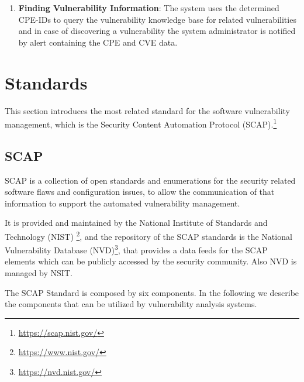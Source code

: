 \documentclass{llncs}
\begin{document}
\begin{enumerate}
   \item \textbf{Finding Vulnerability Information}: The system uses the determined CPE-IDs to query the vulnerability knowledge base for related vulnerabilities and in case of discovering a vulnerability  the system administrator is notified by alert containing the CPE and CVE data.      
   
 
 \end{enumerate}



\section{Standards}
This section introduces the most related standard for the software vulnerability management, which is the Security Content Automation Protocol (SCAP).\footnote{\url{https://scap.nist.gov/}}


\subsection{SCAP}

\par SCAP is a collection of open standards and enumerations for the security related software flaws and configuration issues, to allow the communication of that information to support the automated vulnerability management\cite{scap_doc}. \par   
 It is provided and maintained by the National Institute of Standards and Technology (NIST) \footnote{\url{https://www.nist.gov/}}, and the repository of the SCAP standards is the National Vulnerability Database (NVD)\footnote{\url{https://nvd.nist.gov/}}, that provides a data feeds for the SCAP elements which can be publicly accessed by the security community. Also NVD is managed by NSIT.
 
 The SCAP Standard is composed by six components. In the following we describe the components that can be utilized by vulnerability analysis systems\cite{scap_doc}.
 
\end{document}
